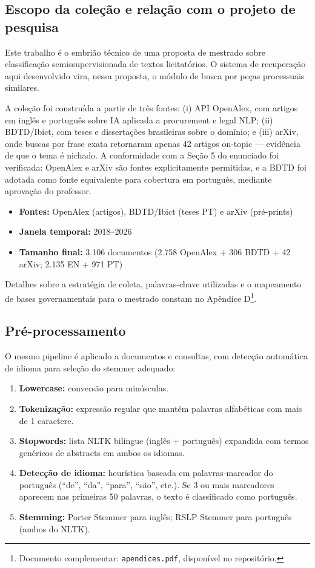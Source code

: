 \documentclass[12pt]{article}
\begin{document}
\subsection{Escopo da coleção e relação com o projeto de pesquisa}

Este trabalho é o embrião técnico de uma proposta de mestrado sobre classificação semissupervisionada de textos licitatórios. O sistema de recuperação aqui desenvolvido vira, nessa proposta, o módulo de busca por peças processuais similares.

A coleção foi construída a partir de três fontes: (i) API OpenAlex, com artigos em inglês e português sobre IA aplicada a procurement e legal NLP; (ii) BDTD/Ibict, com teses e dissertações brasileiras sobre o domínio; e (iii) arXiv, onde buscas por frase exata retornaram apenas 42 artigos on-topic — evidência de que o tema é nichado. A conformidade com a Seção 5 do enunciado foi verificada: OpenAlex e arXiv são fontes explicitamente permitidas, e a BDTD foi adotada como fonte equivalente para cobertura em português, mediante aprovação do professor.

\begin{itemize}
    \item \textbf{Fontes:} OpenAlex (artigos), BDTD/Ibict (teses PT) e arXiv (pré-prints)
    \item \textbf{Janela temporal:} 2018--2026
    \item \textbf{Tamanho final:} 3.106 documentos (2.758 OpenAlex + 306 BDTD + 42 arXiv; 2.135 EN + 971 PT)
\end{itemize}

Detalhes sobre a estratégia de coleta, palavras-chave utilizadas e o mapeamento de bases governamentais para o mestrado constam no Apêndice D\footnote{Documento complementar: \texttt{apendices.pdf}, disponível no repositório.}.

\subsection{Pré-processamento}

O mesmo pipeline é aplicado a documentos e consultas, com detecção automática de idioma para seleção do stemmer adequado:

\begin{enumerate}
    \item \textbf{Lowercase:} conversão para minúsculas.
    \item \textbf{Tokenização:} expressão regular que mantém palavras alfabéticas com mais de 1 caractere.
    \item \textbf{Stopwords:} lista NLTK bilíngue (inglês + português) expandida com termos genéricos de abstracts em ambos os idiomas.
    \item \textbf{Detecção de idioma:} heurística baseada em palavras-marcador do português (``de'', ``da'', ``para'', ``são'', etc.). Se 3 ou mais marcadores aparecem nas primeiras 50 palavras, o texto é classificado como português.
    \item \textbf{Stemming:} Porter Stemmer para inglês; RSLP Stemmer para português (ambos do NLTK).
\end{enumerate}
\end{document}

